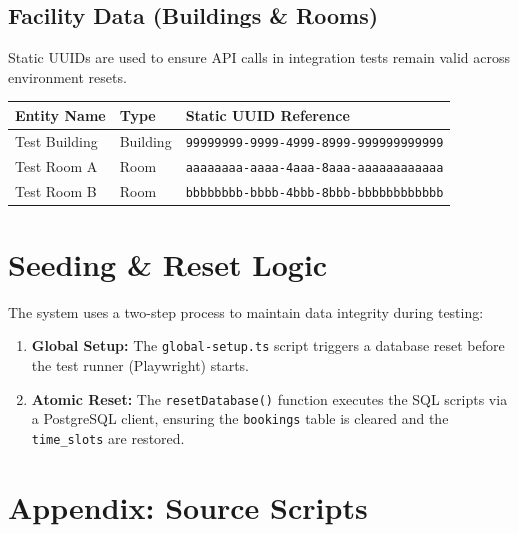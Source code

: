 \documentclass[11pt,a4paper]{article}
\begin{document}
\subsection{Facility Data (Buildings \& Rooms)}
Static UUIDs are used to ensure API calls in integration tests remain valid across environment resets.
\begin{center}
\begin{longtable}{@{}lll@{}}
\toprule
\textbf{Entity Name} & \textbf{Type} & \textbf{Static UUID Reference} \\ \midrule
Test Building & Building & \texttt{99999999-9999-4999-8999-999999999999} \\
Test Room A & Room & \texttt{aaaaaaaa-aaaa-4aaa-8aaa-aaaaaaaaaaaa} \\
Test Room B & Room & \texttt{bbbbbbbb-bbbb-4bbb-8bbb-bbbbbbbbbbbb} \\ \bottomrule
\end{longtable}
\end{center}

\section{Seeding \& Reset Logic}
The system uses a two-step process to maintain data integrity during testing:
\begin{enumerate}
    \item \textbf{Global Setup:} The \texttt{global-setup.ts} script triggers a database reset before the test runner (Playwright) starts.
    \item \textbf{Atomic Reset:} The \texttt{resetDatabase()} function executes the SQL scripts via a PostgreSQL client, ensuring the \texttt{bookings} table is cleared and the \texttt{time\_slots} are restored.
\end{enumerate}

\newpage
\appendix
\section{Appendix: Source Scripts}
\end{document}
